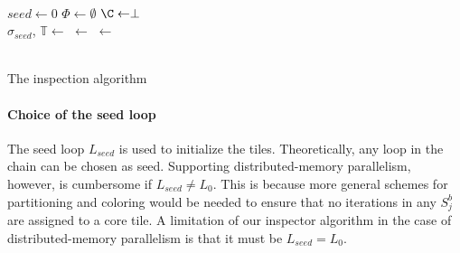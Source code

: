\setcounter{algocf}{0}%
\begin{algorithm}[!t]


\nonl ~\\
$seed \gets 0$\;
$\Phi \gets \emptyset$\;
$\C \gets \perp$\;
\nonl ~\\
$\sigma_{seed}$, $\mathbb{T} \gets$ \;
\SeedMap $\gets$ \;
\Conflicts $\gets$ \False\;
\nonl ~\\
\nonl ~\\
\;
\caption{The inspection algorithm}
\label{algo:st-inspector}
\end{algorithm}





\paragraph{Choice of the seed loop}
The seed loop $L_{seed}$ is used to initialize the tiles. Theoretically, any loop in the chain can be chosen as seed. Supporting distributed-memory parallelism, however, is cumbersome if $L_{seed} \neq L_0$. This is because more general schemes for partitioning and coloring would be needed to ensure that no iterations in any $S_j^{b}$ are assigned to a core tile. A limitation of our inspector algorithm in the case of distributed-memory parallelism is that it must be $L_{seed} = L_0$. 

